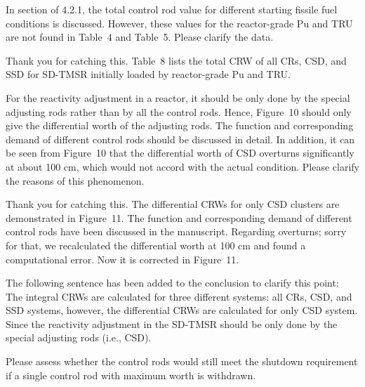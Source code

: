 \documentclass[answers,11pt]{exam}
\begin{document}
\begin{questions}
\begin{solution}
	
\end{solution}

\question In section of 4.2.1, the total control rod value for different starting fissile fuel conditions is discussed. However, these values for the reactor-grade Pu and TRU are not found in Table~4 and Table~5. Please clarify the data.
\begin{solution}
	
	Thank you for catching this. Table~8 lists the total CRW of all CRs, CSD, and SSD for SD-TMSR initially loaded by reactor-grade Pu and TRU. 
	
	
\end{solution}

\question For the reactivity adjustment in a reactor, it should be only done by the special adjusting rods rather than by all the control rods. Hence, Figure~10 should only give the differential worth of the adjusting rods. The function and corresponding demand of different control rods should be discussed in detail. In addition, it can be seen from Figure~10 that the differential worth of CSD overturns significantly at about 100 cm, which would not accord with the actual condition. Please clarify the reasons of this phenomenon.
\begin{solution}
	
	Thank you for catching this. The differential CRWs for only CSD clusters are demonstrated in Figure~11. The function and corresponding demand of different control rods have been discussed in the manuscript. Regarding overturns; sorry for that, we recalculated the differential worth at 100 cm and found a computational error. Now it is corrected in Figure~11. 	
	
	The following sentence has been added to the conclusion to clarify this point:\\
	
	The integral CRWs are calculated for three different systems: all CRs, CSD, and SSD systems, however, the differential CRWs are calculated for only CSD system. Since the reactivity adjustment in the SD-TMSR should be only done by the special adjusting rods (i.e., CSD).
	
	
\end{solution}

\question Please assess whether the control rods would still meet the shutdown requirement if a single control rod with maximum worth is withdrawn.
\begin{solution}
	

\end{solution}
\end{questions}
\end{document}
